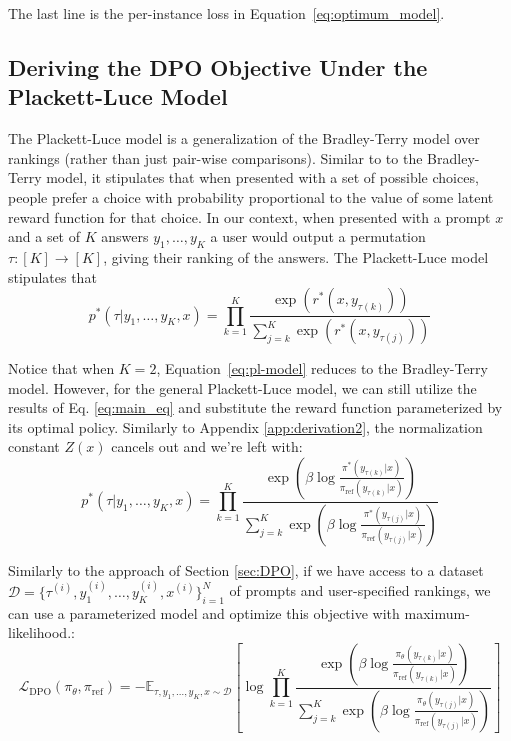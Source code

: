 \documentclass{article}
\begin{document}
The last line is the per-instance loss in Equation~\ref{eq:optimum_model}.

\subsection{Deriving the DPO Objective Under the Plackett-Luce Model}
\label{app:plackett_luce_models}
The Plackett-Luce model \citep{plackett1975analysis, luce2012individual} is a generalization of the Bradley-Terry model over rankings (rather than just pair-wise comparisons). Similar to to the Bradley-Terry model, it stipulates that when presented with a set of possible choices, people prefer a choice with probability proportional to the value of some latent reward function for that choice. In our context, when presented with a prompt $x$ and a set of $K$ answers $y_1, \ldots, y_K$ a user would output a permutation $\tau:[K]\to[K]$, giving their ranking of the answers. The Plackett-Luce model stipulates that
\begin{equation}\label{eq:pl-model}
    p^*(\tau| y_1,\ldots, y_K, x)= \prod_{k=1}^{K}\frac{\exp(r^*(x, y_{\tau(k)}))}{\sum_{j=k}^{K}\exp(r^*(x, y_{\tau(j)}))}
\end{equation}

Notice that when $K=2$, Equation~\ref{eq:pl-model} reduces to the Bradley-Terry model. However, for the general Plackett-Luce model, we can still utilize the results of Eq. \ref{eq:main_eq} and substitute the reward function parameterized by its optimal policy. Similarly to Appendix \ref{app:derivation2}, the normalization constant $Z(x)$ cancels out and we're left with:
\begin{equation}
    p^*(\tau| y_1,\ldots, y_K, x)= \prod_{k=1}^{K}\frac{\exp\left(\beta \log \frac{\pi^*(y_{\tau(k)}|x)}{\pi_\text{ref}(y_{\tau(k)}|x)}\right)}{\sum_{j=k}^{K}\exp\left(\beta \log \frac{\pi^*(y_{\tau(j)}|x)}{\pi_\text{ref}(y_{\tau(j)}|x)}\right)}
\end{equation}

Similarly to the approach of Section \ref{sec:DPO}, if we have access to a dataset $\mathcal{D} = \{\tau^{(i)}, y_1^{(i)}, \ldots, y_K^{(i)}, x^{(i)}\}_{i=1}^N$ of prompts and user-specified rankings, we can use a parameterized model and optimize this objective with maximum-likelihood.:
\begin{equation}
    \mathcal{L}_{\text{DPO}}(\pi_{\theta}, \pi_\text{ref}) = -\mathbb{E}_{\tau, y_1, \ldots, y_K, x\sim\mathcal{D}}\left[\log \prod_{k=1}^{K}\frac{\exp\left(\beta \log \frac{\pi_{\theta}(y_{\tau(k)}|x)}{\pi_\text{ref}(y_{\tau(k)}|x)}\right)}{\sum_{j=k}^{K}\exp\left(\beta \log \frac{\pi_{\theta}(y_{\tau(j)}|x)}{\pi_\text{ref}(y_{\tau(j)}|x)}\right)}\right]
\end{equation}
\end{document}
